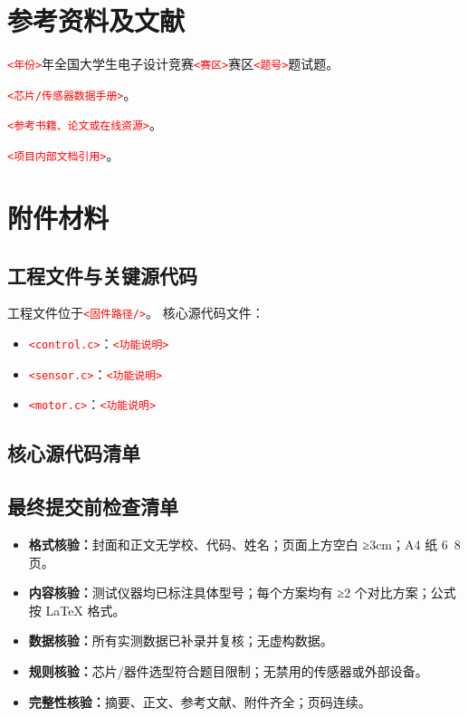 \documentclass[12pt,a4paper,fontset=fandol]{ctexart}
\newcommand{\code}[1]{\texttt{\small #1}}
\newcommand{\placeholder}[1]{\textcolor{red}{\texttt{<#1>}}}
\begin{document}
\section{参考资料及文献}
\begin{enumerate}[label={[\arabic*]}]
  \item \placeholder{年份}年全国大学生电子设计竞赛\placeholder{赛区}赛区\placeholder{题号}题试题。
  \item \placeholder{芯片/传感器数据手册}。
  \item \placeholder{参考书籍、论文或在线资源}。
  \item \placeholder{项目内部文档引用}。
\end{enumerate}

\section{附件材料}

\subsection{工程文件与关键源代码}
工程文件位于\code{\placeholder{固件路径/}}。
核心源代码文件：
\begin{itemize}
  \item \code{\placeholder{control.c}}：\placeholder{功能说明}
  \item \code{\placeholder{sensor.c}}：\placeholder{功能说明}
  \item \code{\placeholder{motor.c}}：\placeholder{功能说明}
\end{itemize}

\subsection{核心源代码清单}

\subsection{最终提交前检查清单}
\begin{itemize}
  \item[$\square$] \textbf{格式核验：}封面和正文无学校、代码、姓名；页面上方空白 ≥3cm；A4 纸 6~8 页。
  \item[$\square$] \textbf{内容核验：}测试仪器均已标注具体型号；每个方案均有 ≥2 个对比方案；公式按 LaTeX 格式。
  \item[$\square$] \textbf{数据核验：}所有实测数据已补录并复核；无虚构数据。
  \item[$\square$] \textbf{规则核验：}芯片/器件选型符合题目限制；无禁用的传感器或外部设备。
  \item[$\square$] \textbf{完整性核验：}摘要、正文、参考文献、附件齐全；页码连续。
\end{itemize}
\end{document}
